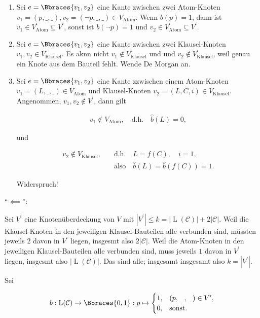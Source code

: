 \begin{solution}
\begin{enumerate}[label = \arabic*.]
    \item Sei $e = \Bbraces{v_1, v_2}$ eine Kante zwischen zwei Atom-Knoten $v_1 = (p, \_, \_), v_2 = (\neg p, \_, \_) \in V_\text{Atom}$.
    Wenn $b(p) = 1$, dann ist $v_1 \in V_\text{Atom}^\prime \subseteq V^\prime$, sonst ist $b(\neg p) = 1$ und $v_2 \in V_\text{Atom}^\prime \subseteq V^\prime$.

    \item Sei $e = \Bbraces{v_1, v_2}$ eine Kante zwischen zwei Klausel-Knoten $v_1, v_2 \in V_\text{Klausel}$.
    Es aknn nicht $v_1 \not \in V_\text{Klausel}^\prime$ und und $v_2 \not \in V_\text{Klausel}^\prime$, weil genau ein Knote aus dem Bauteil fehlt.
    Wende De Morgan an.

    \item Sei $e = \Bbraces{v_1, v_2}$ eine Kante zzwischen einem Atom-Knoten $v_1 = (L, \_, \_) \in V_\text{Atom}$ und Klausel-Knoten $v_2 = (L, C, i) \in V_\text{Klausel}$.
    Angenommen, $v_1, v_2 \not \in V^\prime$, dann gilt

    \begin{align*}
        v_1 \not \in V_\text{Atom},
        \quad
        \text{d.h.}
        \quad
        \hat b(L) = 0,
    \end{align*}

    und

    \begin{align*}
        v_2 \not \in V_\text{Klausel},
        \quad
        & \text{d.h.}
        \quad
        L = f(C), \quad i = 1, \\
        & \text{also}
        \quad
        \hat b(L) = \hat b(f(C)) = 1.
    \end{align*}

    Widerspruch!

\end{enumerate}

\enquote{$\impliedby$}:

Sei $V^\prime$ eine Knotenüberdeckung von $V$ mit $|V^\prime| \leq k = |\operatorname L(\mathcal C)| + 2 |\mathcal C|$.
Weil die Klausel-Knoten in den jeweiligen Klausel-Bauteilen alle verbunden sind, müssten jeweils $2$ davon in $V^\prime$ liegen, insgesmt also $2 |\mathcal C|$.
Weil die Atom-Knoten in den jeweiligen Klausel-Bauteilen alle verbunden sind, muss jeweils $1$ davon in $V^\prime$ liegen, insgesmt also $|\operatorname L(\mathcal C)|$.
Das sind alle; insgesamt insgesamt also $k = |V^\prime|$.

Sei

\begin{align*}
    b:
        \operatorname L(\mathcal C) \to \Bbraces{0, 1}:
        p
        \mapsto
        \begin{cases}
            1, & (p, \_, \_) \in V^\prime, \\
            0, & \text{sonst}.
        \end{cases}
\end{align*}


\end{solution}
